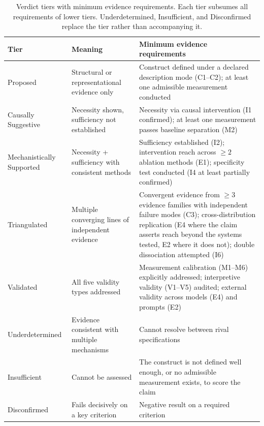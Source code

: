 \documentclass{article}
\newcommand{\tighttable}{\setlength{\tabcolsep}{4pt}\renewcommand{\arraystretch}{1.05}}
\begin{document}
\begin{table}[tbp]
\centering
\footnotesize
\tighttable
\caption{Verdict tiers with minimum evidence requirements. Each tier subsumes all requirements of lower tiers. Underdetermined, Insufficient, and Disconfirmed replace the tier rather than accompanying it.}
\label{tab:verdicts}
\begin{tabular}{@{}>{\raggedright\arraybackslash}p{2.1cm}>{\raggedright\arraybackslash}p{3.2cm}>{\raggedright\arraybackslash}p{6.9cm}@{}}
\toprule
\textbf{Tier} & \textbf{Meaning} & \textbf{Minimum evidence requirements} \\
\midrule
Proposed & Structural or representational evidence only & Construct defined under a declared description mode (C1--C2); at least one admissible measurement conducted \\
\midrule
Causally Suggestive & Necessity shown, sufficiency not established & Necessity via causal intervention (I1 confirmed); at least one measurement passes baseline separation (M2) \\
\midrule
Mechanistically Supported & Necessity + sufficiency with consistent methods & Sufficiency established (I2); intervention reach across $\geq 2$ ablation methods (E1); specificity test conducted (I4 at least partially confirmed) \\
\midrule
Triangulated & Multiple converging lines of independent evidence & Convergent evidence from $\geq 3$ evidence families with independent failure modes (C3); cross-distribution replication (E4 where the claim asserts reach beyond the systems tested, E2 where it does not); double dissociation attempted (I6) \\
\midrule
Validated & All five validity types addressed & Measurement calibration (M1--M6) explicitly addressed; interpretive validity (V1--V5) audited; external validity across models (E4) and prompts (E2) \\
\midrule
Underdetermined & Evidence consistent with multiple mechanisms & Cannot resolve between rival specifications \\
\midrule
Insufficient & Cannot be assessed & The construct is not defined well enough, or no admissible measurement exists, to score the claim \\
\midrule
Disconfirmed & Fails decisively on a key criterion & Negative result on a required criterion \\
\bottomrule
\end{tabular}
\end{table}
\end{document}
